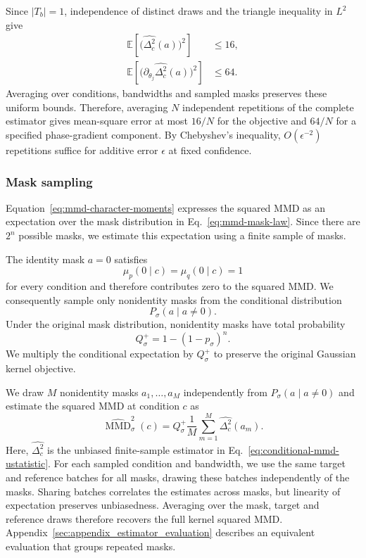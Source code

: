 \documentclass[pra,aps,10pt,twocolumn,floatfix,superscriptaddress, notitlepage,longbibliography]{revtex4-2}
\newcommand{\E}{\mathbb{E}}
\newcommand{\mmd}{\operatorname{MMD}}
\begin{document}
Since $|T_b|=1$, independence of distinct draws and the triangle inequality in $L^2$ give
\[
\begin{aligned}
    \E\!\left[\bigl(\widehat{\Delta_c^2}(a)\bigr)^2\right]&\leq16,\\
    \E\!\left[\bigl(\partial_{\theta_j}\widehat{\Delta_c^2}(a)\bigr)^2\right]&\leq64.
\end{aligned}
\]
Averaging over conditions, bandwidths and sampled masks preserves these uniform bounds. Therefore, averaging $N$ independent repetitions of the complete estimator gives mean-square error at most $16/N$ for the objective and $64/N$ for a specified phase-gradient component. By Chebyshev's inequality, $O(\epsilon^{-2})$ repetitions suffice for additive error $\epsilon$ at fixed confidence.

\subsubsection{Mask sampling}
\label{sec:mask-sampling}

Equation~\eqref{eq:mmd-character-moments} expresses the squared MMD as an expectation over the mask distribution in Eq.~\eqref{eq:mmd-mask-law}. Since there are $2^n$ possible masks, we estimate this expectation using a finite sample of masks.

The identity mask $a=0$ satisfies
\begin{equation}
    \mu_p(0\mid c)=\mu_q(0\mid c)=1
\end{equation}
for every condition and therefore contributes zero to the squared MMD. We consequently sample only nonidentity masks from the conditional distribution
\begin{equation}
    P_\sigma(a\mid a\neq0).
\end{equation}
Under the original mask distribution, nonidentity masks have total probability
\begin{equation}
    Q_\sigma^+
    =
    1-(1-p_\sigma)^n.
    \label{eq:mmd-nonidentity-mass}
\end{equation}
We multiply the conditional expectation by $Q_\sigma^+$ to preserve the original Gaussian kernel objective.

We draw $M$ nonidentity masks $a_1,\ldots,a_M$ independently from $P_\sigma(a\mid a\neq0)$ and estimate the squared MMD at condition $c$ as
\begin{equation}
    \widehat{\mmd}_{\sigma}^2(c)
    =
    Q_\sigma^+
    \frac{1}{M}
    \sum_{m=1}^{M}
    \widehat{\Delta_c^2}(a_m).
    \label{eq:sampled-mmd-estimator}
\end{equation}
Here, $\widehat{\Delta_c^2}$ is the unbiased finite-sample estimator in Eq.~\eqref{eq:conditional-mmd-ustatistic}. For each sampled condition and bandwidth, we use the same target and reference batches for all masks, drawing these batches independently of the masks. Sharing batches correlates the estimates across masks, but linearity of expectation preserves unbiasedness. Averaging over the mask, target and reference draws therefore recovers the full kernel squared MMD. Appendix~\ref{sec:appendix_estimator_evaluation} describes an equivalent evaluation that groups repeated masks.
\end{document}
